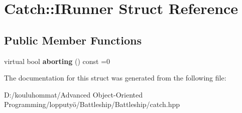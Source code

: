 \hypertarget{struct_catch_1_1_i_runner}{}\section{Catch\+:\+:I\+Runner Struct Reference}
\label{struct_catch_1_1_i_runner}
\subsection*{Public Member Functions}
\begin{DoxyCompactItemize}
\item 
\mbox{\label{struct_catch_1_1_i_runner_a03713202dd2e041e30b8030088ab0116}} 
virtual bool {\bfseries aborting} () const =0
\end{DoxyCompactItemize}


The documentation for this struct was generated from the following file\+:\begin{DoxyCompactItemize}
\item 
D\+:/kouluhommat/\+Advanced Object-\/\+Oriented Programming/lopputyö/\+Battleship/\+Battleship/catch.\+hpp\end{DoxyCompactItemize}
